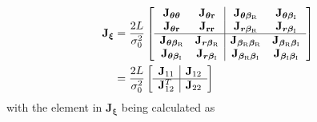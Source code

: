 \documentclass[10pt,journal,twocolumn]{IEEEtran}
\begin{document}
\begin{align}
\mathbf{J}_{\bm{\xi}}&=\frac{2L}{\sigma^2_0}\left[\begin{array}{cc|cc}
\mathbf{J}_{\bm{\theta}\bm{\theta}} & \mathbf{J}_{\bm{\theta}\mathbf{r}} & \mathbf{J}_{\bm{\theta}\bm{\beta}_\text{R}} & \mathbf{J}_{\bm{\theta}\bm{\beta}_\text{I}}\\
\mathbf{J}_{\bm{\theta}\mathbf{r}}&\mathbf{J}_{\mathbf{r}\mathbf{r}}&\mathbf{J}_{\bm{r}\bm{\beta}_\text{R}}&\mathbf{J}_{\bm{r}\bm{\beta}_\text{I}}\\
\hline 
\mathbf{J}_{\bm{\theta}\bm{\beta}_\text{R}}&\mathbf{J}_{\bm{r}\bm{\beta}_\text{R}}&\mathbf{J}_{\bm{\beta}_\text{R}\bm{\beta}_\text{R}}&\mathbf{J}_{\bm{\beta}_\text{R}\bm{\beta}_\text{I}}\\
\mathbf{J}_{\bm{\theta}\bm{\beta}_\text{I}}&\mathbf{J}_{\bm{r}\bm{\beta}_\text{I}}&\mathbf{J}_{\bm{\beta}_\text{R}\bm{\beta}_\text{I}}&\mathbf{J}_{\bm{\beta}_\text{I}\bm{\beta}_\text{I}}
\end{array}\right]\notag\\&=\frac{2L}{\sigma^2_0}\left[\begin{array}{c|c}
\mathbf{J}_{11} & \mathbf{J}_{12}\\
\hline \mathbf{J}^T_{12}&\mathbf{J}_{22}\\
\end{array}\right]
\end{align}  
with  the element in $\mathbf{J}_{\bm{\xi}}$ being calculated as 
\end{document}
